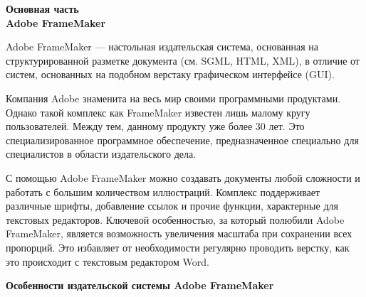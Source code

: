 \documentclass[a4paper,12pt]{article} %
\begin{document}
\newpage

\begin{center}
\huge \textbf{Основная часть}\\[1cm]

\Large \textbf{Adobe FrameMaker}
\end{center}

\normalsize

        Adobe FrameMaker — настольная издательская система, основанная на структурированной разметке документа (см. SGML, HTML, XML), в отличие от систем, основанных на подобном  верстаку графическом  интерфейсе (GUI).

        Компания Adobe знаменита на весь мир своими программными продуктами. Однако такой комплекс как FrameMaker известен лишь малому кругу пользователей. Между тем, данному продукту уже более 30 лет. Это специализированное программное обеспечение, предназначенное специально для специалистов в области издательского дела.

         С помощью Adobe FrameMaker можно создавать документы любой сложности и работать с большим количеством иллюстраций. Комплекс поддерживает различные шрифты, добавление ссылок и прочие функции, характерные для текстовых редакторов. Ключевой особенностью, за который полюбили Adobe FrameMaker, является возможность увеличения масштаба при сохранении всех пропорций. Это избавляет от необходимости регулярно проводить верстку, как это происходит с текстовым редактором Word.

\newpage

\begin{center}
\Large \textbf{Особенности издательской системы Adobe FrameMaker}
\end{center}

\normalsize
\end{document}
